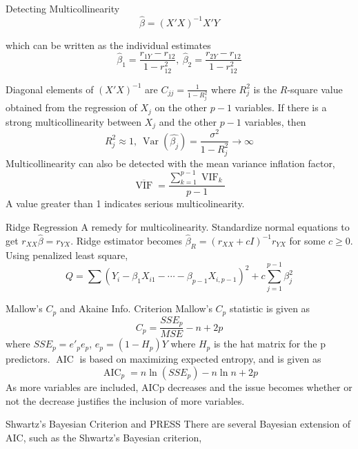 \documentclass{article}
\DeclareMathOperator{\Var}{Var}
\DeclareMathOperator{\vif}{VIF}
\DeclareMathOperator{\aic}{AIC}
\begin{document}
\begin{multicols*}{3}
\begin{blackbox}{Detecting Multicollinearity}
        \[\hat{\beta} = (X'X)^{-1}X'Y\]
        
        which can be written as the individual estimates\\[-2ex]
        
        \[\hat{\beta}_1 = \frac{r_{1Y} - r_{12}}{1-r_{12}^2}, \ \hat{\beta}_2 = \frac{r_{2Y} - r_{12}}{1-r_{12}^2}\]
        
        Diagonal elements of $(X'X)^{-1}$ are $C_{jj} = \frac{1}{1-R_j^2}$ where $R_j^2$ is the $R$-square value obtained from the regression of $X_j$ on the other $p-1$ variables. If there is a strong multicollinearity between $X_j$ and the other $p-1$ variables, then \\[-3ex]
        \[R_j^2 \approx 1, \ \Var(\hat{\beta_j}) = \frac{\sigma^2}{1-R_j^2} \rightarrow \infty\]
        Multicollinearity can also be detected with the mean variance inflation factor, \\[-3ex]
        \[\overline{\vif} = \frac{\sum_{k=1}^{p-1}\vif_k}{p-1}\]
        A value greater than 1 indicates serious multicolinearity.
        \end{blackbox}
        \begin{blackbox}{Ridge Regression}
            A remedy for multicolinearity. Standardize normal equations to get $r_{XX}\hat{\beta} = r_{YX}$. Ridge estimator becomes $\hat{\beta}_R = (r_{XX} + cI)^{-1}r_{YX}$ for some $c \geq 0$. Using penalized least square, \\[-5ex]
            \[Q = \sum (Y_i - \beta_1X_{i1} - \cdots - \beta_{p-1}X_{i,p-1})^2 + c \sum_{j=1}^{p-1}\beta_j^2\]
        \end{blackbox}
        \begin{blackbox}{Mallow's $C_p$ and Akaine Info. Criterion}
            Mallow's $C_p$ statistic is given as \\[-2ex]
            \[C_p = \frac{SSE_p}{MSE} - n + 2p\]
            where $SSE_p = e'_pe_p$, $e_p = (1-H_p)Y$ where $H_p$ is the hat matrix for the p predictors. $\aic$ is based on maximizing expected entropy, and is given as\\[-2ex]
            \[\aic_p = n\ln(SSE_p) - n\ln n + 2p\]
            As more variables are included, AICp decreases and the issue becomes whether or not the decrease justifies the inclusion of more variables.
        \end{blackbox}
        \begin{blackbox}{Shwartz's Bayesian Criterion and PRESS}
            There are several Bayesian extension of AIC, such as the Shwartz's Bayesian criterion,

\end{blackbox}
\end{multicols*}
\end{document}
